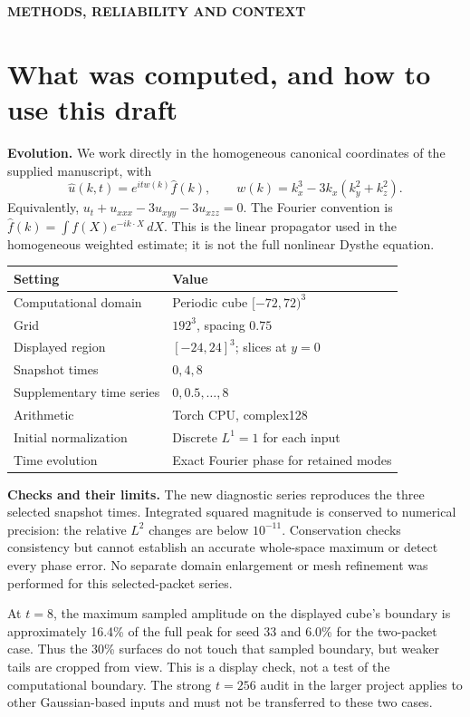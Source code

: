 \documentclass[10pt,letterpaper]{article}
\newcommand{\tagline}[1]{{\color{teal}\bfseries #1}\par}
\begin{document}
\newpage
\tagline{METHODS, RELIABILITY AND CONTEXT}
\section*{What was computed, and how to use this draft}
\textbf{Evolution.} We work directly in the homogeneous canonical coordinates of
the supplied manuscript, with
\[
 \widehat u(k,t)=e^{itw(k)}\widehat f(k),\qquad
 w(k)=k_x^3-3k_x(k_y^2+k_z^2).
\]
Equivalently, $u_t+u_{xxx}-3u_{xyy}-3u_{xzz}=0$. The Fourier convention is
$\widehat f(k)=\int f(X)e^{-ik\cdot X}\,dX$. This is the linear propagator used
in the homogeneous weighted estimate; it is not the full nonlinear Dysthe equation.

\begin{center}\begin{tabular}{ll}\toprule
Setting & Value\\\midrule
Computational domain & Periodic cube $[-72,72)^3$\\
Grid & $192^3$, spacing $0.75$\\
Displayed region & $[-24,24]^3$; slices at $y=0$\\
Snapshot times & $0,4,8$\\
Supplementary time series & $0,0.5,\ldots,8$\\
Arithmetic & Torch CPU, complex128\\
Initial normalization & Discrete $L^1=1$ for each input\\
Time evolution & Exact Fourier phase for retained modes\\\bottomrule
\end{tabular}\end{center}
\textbf{Checks and their limits.} The new diagnostic series reproduces the three
selected snapshot times. Integrated squared magnitude is conserved to numerical
precision: the relative $L^2$ changes are below $10^{-11}$. Conservation checks
consistency but cannot establish an accurate whole-space maximum or detect every
phase error. No separate domain enlargement or mesh refinement was performed for
this selected-packet series.

At $t=8$, the maximum sampled amplitude on the displayed cube's boundary is
approximately 16.4\% of the full peak for seed 33 and 6.0\% for the two-packet case.
Thus the 30\% surfaces do not touch that sampled boundary, but weaker tails are
cropped from view. This is a display check, not a test of the computational boundary.
The strong $t=256$ audit in the larger project applies to other Gaussian-based
inputs and must not be transferred to these two cases.
\end{document}
